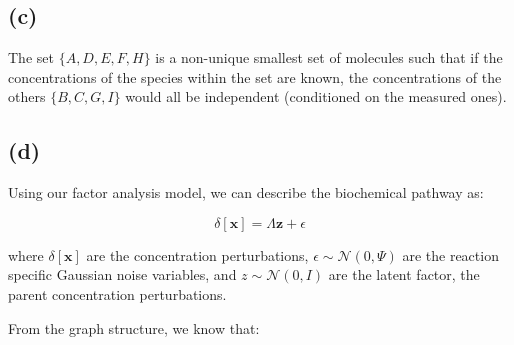 \documentclass[12pt]{article}
\begin{document}
\subsection*{(c)}

\begin{center}
\end{center}


The set $\{A, D, E, F, H\}$ is a non-unique smallest set of molecules such that if the concentrations of the species within the set are known, the concentrations of the others $\{B, C, G, I\}$ would all be independent (conditioned on the measured ones).


\subsection*{(d)}

Using our factor analysis model, we can describe the biochemical pathway as:

\[\delta[\textbf{x}] = \Lambda \textbf{z} + \epsilon\]

where $\delta[\textbf{x}]$ are the concentration perturbations, $\epsilon \sim \mathcal{N} (0, \Psi)$ are the reaction specific Gaussian noise variables, and $z \sim \mathcal{N} (0, I)$ are the latent factor, the parent concentration perturbations.

From the graph structure, we know that:
\end{document}
